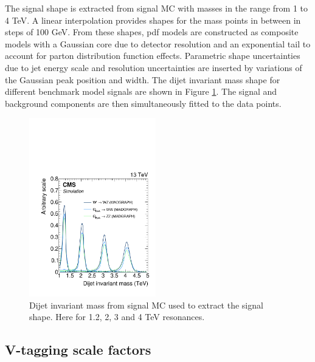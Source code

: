 The signal shape is extracted from signal MC with masses in the range from 1 to 4 TeV. A linear interpolation provides shapes for the mass points in between in steps of 100 GeV. From these shapes, pdf models are constructed as composite models with a Gaussian core due to detector resolution and an exponential tail to account for parton distribution function effects. Parametric shape uncertainties due to jet energy scale and resolution uncertainties are inserted by variations of the Gaussian peak position and width. The dijet invariant mass shape for different benchmark model signals are shown in Figure \ref{fig:searchI:sigfit}. The signal and background components are then simultaneously fitted to the data points.
\begin{figure}[h!]
\centering
\includegraphics[width=0.49\textwidth]{figures/analysis/search1/B2G-16-004/Figure_005-a.pdf}
\caption{Dijet invariant mass from signal MC used to extract the signal shape. Here for 1.2, 2, 3 and 4 TeV resonances.}
\label{fig:searchI:sigfit}
\end{figure}
\clearpage

\subsection{V-tagging scale factors}
\label{sec:searchI:vtag}

